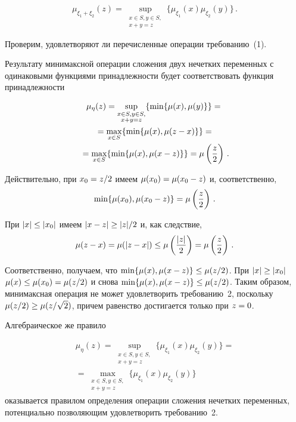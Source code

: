 \begin{multicols}{2}
\begin{itemize}
  \noindent
  $$
  \mu_{\xi_1+\xi_2}(z)= 
\sup\limits_{\substack{{x\in S, y\in S,}\\{x+y=z}}} 
\{\mu_{\xi_1}(x)\mu_{\xi_2}(y)\}\,.
$$
  \end{itemize}
  
  Проверим, удовлетворяют ли перечисленные операции требованию~(1).
  
  Результату минимаксной операции сложения двух нечетких переменных с 
одинаковыми функциями принадлежности будет соответствовать функция 
принадлежности 

\noindent
\begin{multline*}
\mu_\eta(z) = \sup\limits_{\substack{{x\in S, y\in S,}\\{x+y=z}}}\{\min\{\mu(x),\mu(y)\}\}={}\\
{}=
\max\limits_{x\in  S}\{\min\{\mu(x),\mu(z-x)\}\}={}\\
{}= \max\limits_{x\in S}\{\min\{\mu(x),\mu(x-z)\}\}=\mu\left(\displaystyle\frac{\displaystyle z\mathstrut}{\displaystyle 2\mathstrut}\right)\,.
\end{multline*}

Действительно, при $x_0\hm=z/2$ имеем 
$\mu(x_0)\hm=\mu(x_0-z)$ и, соответственно, 
$$
\min\{\mu(x_0),\mu(x_0- z)\}=\mu\left(\displaystyle\frac{\displaystyle z\mathstrut}{\displaystyle 2\mathstrut}\right)\,.
$$ 


При $\vert x\vert \hm\leq \vert x_0\vert$ имеем $\vert x-z\vert 
\hm\geq \vert z\vert /2$ и, как следствие, 
$$
\mu(z-x)=\mu(\vert z-x\vert ) \leq  \mu\left(\displaystyle\frac{\displaystyle \vert z\vert\mathstrut}{\displaystyle 2\mathstrut}\right)=\mu\left(\displaystyle\frac{\displaystyle z\mathstrut}{\displaystyle 2\mathstrut}\right)\,.
$$

Соответственно, получаем, что 
$\min\{\mu(x),\mu(x\hm-z)\}\hm\leq \mu(z/2)$. При $\vert x\vert \hm\geq \vert 
x_0\vert$ $\mu(x)\hm\leq \mu(x_0)\hm=\mu(z/2)$ и снова $\min\{\mu(x),\mu(x\hm-
z)\}\hm\leq \mu(z/2)$. Таким образом, минимаксная операция не может 
удовлетворить требованию~2, поскольку $\mu(z/2)\hm\geq \mu(z/\sqrt{2})$, причем 
равенство достигается только при $z\hm=0$.
  
  Алгебраическое же правило 
  
  \noindent
  \begin{multline*}
  \mu_\eta(z) =\sup\limits_{\substack{{x\in S, 
y\in S,}\\{x+y=z}}}\{\mu_{\xi_1}(x)\mu_{\xi_2}(y)\} = {}\\
{}=
\max\limits_{\substack{{x\in S, y\in S,}\\{x+y=z}}}\{\mu_{\xi_1}(x) 
\mu_{\xi_2}(y)\}
\end{multline*} 
оказывается правилом определения операции сложения 
нечетких переменных, потенциально позволяющим удовлетворить 
требованию~2.
  

\end{multicols}
